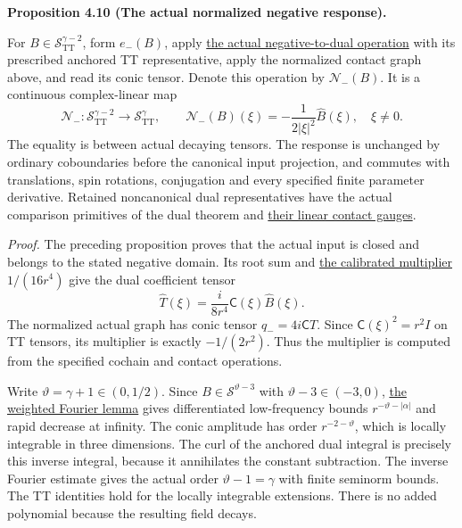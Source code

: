 \documentclass[
  english,
  11pt,
  reqno]{amsart}
\makeatletter
\newcommand{\pandocstatementheading}[1]{%
  \par\if@nobreak\else
    \addpenalty{\@beginparpenalty}%
    \addvspace{.5\baselineskip plus .2\baselineskip minus .2\baselineskip}%
  \fi
  {\normalfont\bfseries #1\par}%
  \nobreak\@afterindenttrue\@afterheading
}
\makeatother
\begin{document}
\pandocstatementheading{\leavevmode{}\label{prop:online-normalized-negative-half-newton}Proposition 4.10 (The actual normalized negative response).}

For \(B\in\mathscr S^{\gamma-2}_{\mathrm{TT}}\), form \(e_-(B)\), apply
\hyperref[thm:online-actual-weighted-negative-dual]{the actual
negative-to-dual operation} with its prescribed anchored TT
representative, apply the normalized contact graph above, and read its
conic tensor. Denote this operation by \(\mathcal N_-(B)\). It is a
continuous complex-linear map%
 \[
\mathcal N_-:\mathscr S^{\gamma-2}_{\mathrm{TT}}
\longrightarrow\mathscr S^\gamma_{\mathrm{TT}},
\qquad
\widehat{\mathcal N_-(B)}(\xi)
=-\frac1{2|\xi|^2}\widehat B(\xi),\quad \xi\ne0.
\] The equality is between actual decaying tensors. The response is
unchanged by ordinary coboundaries before the canonical input
projection, and commutes with translations, spin rotations, conjugation
and every specified finite parameter derivative. Retained noncanonical
dual representatives have the actual comparison primitives of the dual
theorem and
\hyperref[prop:online-dual-primitive-linear-contact-gauge]{their linear
contact gauges}.

\emph{Proof.} The preceding proposition proves that the actual input is
closed and belongs to the stated negative domain. Its root sum and
\hyperref[eq:online-negative-dual-calibrated-multiplier]{the calibrated
multiplier} \(1/(16r^4)\) give the dual coefficient tensor \[
\widehat T(\xi)=\frac{i}{8r^4}\mathsf C(\xi)\widehat B(\xi).
\] The normalized actual graph has conic tensor \(q_-=4i\mathsf CT\).
Since \(\mathsf C(\xi)^2=r^2I\) on TT tensors, its multiplier is exactly
\(-1/(2r^2)\). Thus the multiplier is computed from the specified
cochain and contact operations.

Write \(\vartheta=\gamma+1\in(0,1/2)\). Since
\(B\in\mathscr S^{\vartheta-3}\) with \(\vartheta-3\in(-3,0)\),
\hyperref[lem:online-decay-fourier-isomorphism]{the weighted Fourier
lemma} gives differentiated low-frequency bounds
\(r^{-\vartheta-|\alpha|}\) and rapid decrease at infinity. The conic
amplitude has order \(r^{-2-\vartheta}\), which is locally integrable in
three dimensions. The curl of the anchored dual integral is precisely
this inverse integral, because it annihilates the constant subtraction.
The inverse Fourier estimate gives the actual order
\(\vartheta-1=\gamma\) with finite seminorm bounds. The TT identities
hold for the locally integrable extensions. There is no added polynomial
because the resulting field decays.
\end{document}
